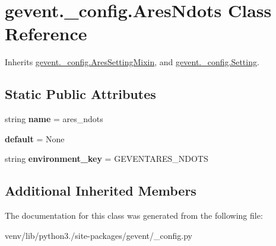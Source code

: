 \hypertarget{classgevent_1_1__config_1_1_ares_ndots}{}\section{gevent.\+\_\+config.\+Ares\+Ndots Class Reference}
\label{classgevent_1_1__config_1_1_ares_ndots}


Inherits \hyperlink{classgevent_1_1__config_1_1_ares_setting_mixin}{gevent.\+\_\+config.\+Ares\+Setting\+Mixin}, and \hyperlink{classgevent_1_1__config_1_1_setting}{gevent.\+\_\+config.\+Setting}.

\subsection*{Static Public Attributes}
\begin{DoxyCompactItemize}
\item 
\mbox{\label{classgevent_1_1__config_1_1_ares_ndots_a5c5926a4506fc6eca757a5242ed9cacb}} 
string {\bfseries name} = \textquotesingle{}ares\+\_\+ndots\textquotesingle{}
\item 
\mbox{\label{classgevent_1_1__config_1_1_ares_ndots_aab7bf552fb647036b6b0f28ac5571b0c}} 
{\bfseries default} = None
\item 
\mbox{\label{classgevent_1_1__config_1_1_ares_ndots_a8991608c85177f6681046f1c35c54aae}} 
string {\bfseries environment\+\_\+key} = \textquotesingle{}G\+E\+V\+E\+N\+T\+A\+R\+E\+S\+\_\+\+N\+D\+O\+TS\textquotesingle{}
\end{DoxyCompactItemize}
\subsection*{Additional Inherited Members}


The documentation for this class was generated from the following file\+:\begin{DoxyCompactItemize}
\item 
venv/lib/python3./site-\/packages/gevent/\+\_\+config.\+py\end{DoxyCompactItemize}
